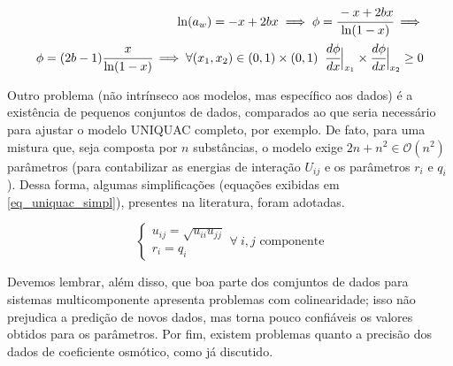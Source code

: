 \documentclass[
	12pt,				%
	openright,
	twoside,
	a4paper,			%
	brazil,			%
	french,				%
	spanish,			%
	english				%
	]{abntex2}
\begin{document}
\begin{equation}
	\label{eq_phi_virial_mono_frac}
	\begin{split}
		\ln(a_w) = -x + 2bx \implies \phi =
			\cfrac{-x + 2bx}{\ln(1-x)}\implies\\
		\phi = (2b-1)\cfrac{x}{\ln(1-x)} \implies
			\forall (x_1,x_2) \in (0,1)\times(0,1)\;\;
			\cfrac{d\phi}{dx}\Big|_{x_1} \times
			\cfrac{d\phi}{dx}\Big|_{x_2} \ge 0
	\end{split}
\end{equation}

Outro problema (não intrínseco aos modelos, mas específico aos dados) é a
existência de pequenos conjuntos de dados, comparados ao que seria
necessário para ajustar o modelo UNIQUAC completo, por exemplo. De fato,
para uma mistura que, seja composta por $n$ substâncias, o modelo exige
$2n+n^2 \in \mathcal{O}(n^2)$ parâmetros (para contabilizar as energias de
interação $U_{ij}$ e os parâmetros $r_i$ e $q_i$). Dessa forma, algumas
simplificações (equações exibidas em \ref{eq_uniquac_simpl}), presentes
na literatura, foram adotadas.

\begin{equation}
	\label{eq_uniquac_simpl}
	\begin{cases}
		u_{ij} = \sqrt{u_{ii}u_{jj}}\\
		r_i = q_i
	\end{cases}\forall\ i, j\text{ componente}
\end{equation}

Devemos lembrar, além disso, que boa parte dos comjuntos de dados para sistemas
multicomponente apresenta problemas com colinearidade; isso não prejudica a
predição de novos dados, mas torna pouco confiáveis os valores obtidos para os
parâmetros. Por fim, existem problemas quanto a precisão dos dados de coeficiente
osmótico, como já discutido.
\end{document}
